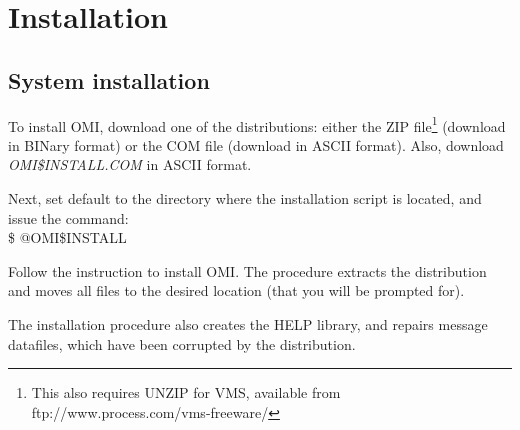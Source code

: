 \documentclass[a4paper]{book}
\newcommand{\vs}{\vspace{3mm}}
\renewcommand{\indent}{\hspace*{5mm}}
\begin{document}
\chapter{Installation}
\label{sec:installationrmed}

\section{System installation}
\label{subsec:system}

To install OMI, download one of the distributions: either
the ZIP file\footnote{ This also requires UNZIP for VMS, available from
ftp://www.process.com/vms-freeware/} (download in BINary format) or the COM file
(download in ASCII format).
Also, download \textsl{OMI{\$}INSTALL.COM} in ASCII format.
 
Next, set default to the directory where the installation
script is located, and issue the command: \\
\indent \textsf{{\$} @OMI{\$}INSTALL}
 

\vs

Follow the instruction to install OMI.
The procedure extracts the distribution and moves all
files to the desired location (that you will be prompted for).
 
The installation procedure also creates the HELP library,
and repairs message datafiles, which have been corrupted
by the distribution.
\end{document}

